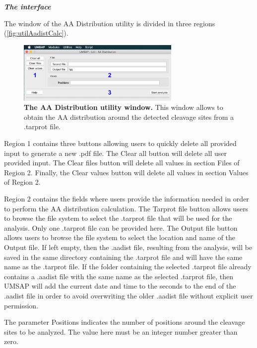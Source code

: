 \textit{\textbf{The interface}}

The window of the AA Distribution utility is divided in three regions (\autoref{fig:utilAadistCalc}).

\begin{figure}[h]
	\centering
	\includegraphics[width=0.7\textwidth]{./IMAGES/UTIL-AA-WINDOW/util-aa.jpg}	    
	\caption[The AA Distribution utility window]{\textbf{The AA Distribution utility window.} This window allows to obtain the AA distribution around the detected cleavage sites from a .tarprot file.} 
	\label{fig:utilAadistCalc}
	\vspace{-5pt} 	
\end{figure}

Region \num{1} contains three buttons allowing users to quickly delete all provided input to generate a new .pdf file. The Clear all button will delete all user provided input. The Clear files button will delete all values in section Files of Region \num{2}. Finally, the Clear values button will delete all values in section Values of Region \num{2}.

Region \num{2} contains the fields where users provide the information needed in order to perform the AA distribution calculation. The Tarprot file button allows users to browse the file system to select the .tarprot file that will be used for the analysis. Only one .tarprot file can be provided here. The Output file button allows users to browse the file system to select the location and name of the Output file. If left empty, then the .aadist file, resulting from the analysis, will be saved in the same directory containing the .tarprot file and will have the same name as the .tarprot file. If the folder containing the selected .tarprot file already contains a .aadist file with the same name as the selected .tarprot file, then UMSAP will add the current date and time to the seconds to the end of the .aadist file in order to avoid overwriting the older .aadist file without explicit user permission.    

The parameter Positions indicates the number of positions around the cleavage sites to be analyzed. The value here must be an integer number greater than zero.

